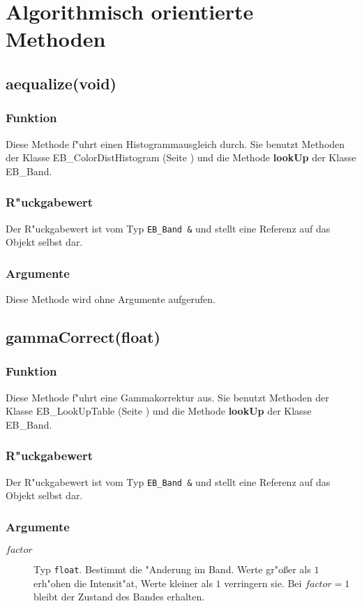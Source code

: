 \documentclass[12pt,a4paper,draft,twoside,onecolumn,titlepage]{book}
\newcommand{\pref}[1]{(Seite \pageref{#1})}
\newcommand{\method}[1]{{\bf #1}}
\newcommand{\carg}[1]{$ #1 $}
\newcommand{\ctyp}[1]{{\tt #1}}
\newcommand{\class}[1]{{\sc #1}}
\newcommand{\arglist}[1]{\footnotesize{#1}}
\begin{document}
\section{Algorithmisch orientierte Methoden}
\label{ebbandmethodm}
\subsection{aequalize{\arglist(void)}}
\subsubsection{Funktion}
Diese Methode f"uhrt einen Histogrammausgleich durch. Sie benutzt Methoden der Klasse \class{EB\_ColorDistHistogram} \pref{classcolordisthistogram} und die Methode \method{lookUp} der Klasse \class{EB\_Band}.
\subsubsection{R"uckgabewert}
Der R"uckgabewert ist vom Typ \ctyp{EB\_Band \&} und stellt eine Referenz auf das Objekt selbst dar. 
\subsubsection{Argumente}
Diese Methode wird ohne Argumente aufgerufen.
\subsection{gammaCorrect{\arglist(float)}}
\subsubsection{Funktion}
Diese Methode f"uhrt eine Gammakorrektur aus. Sie benutzt Methoden der Klasse \class{EB\_LookUpTable} \pref{classeblookuptable} und die Methode \method{lookUp} der Klasse \class{EB\_Band}.
\subsubsection{R"uckgabewert}
Der R"uckgabewert ist vom Typ \ctyp{EB\_Band \&} und stellt eine Referenz auf das Objekt selbst dar. 
\subsubsection{Argumente}
\begin{description}
\item[\carg{factor}]{Typ \ctyp{float}. Bestimmt die "Anderung im Band. Werte gr"o{\ss}er als $1$ erh"ohen die Intensit"at, Werte kleiner als $1$ verringern sie. Bei $factor=1$ bleibt der Zustand des Bandes erhalten.}
\end{description}
\end{document}
